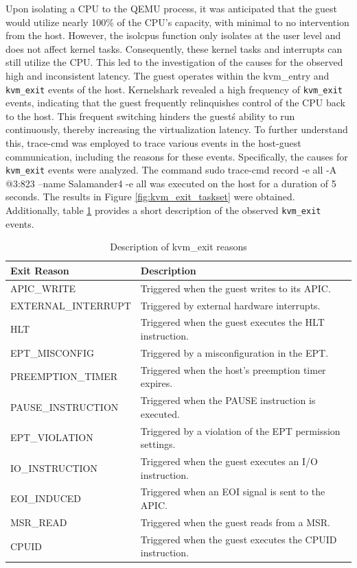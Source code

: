 \documentclass[MMR,Master,english]{twbook}
\begin{document}
\noindent Upon isolating a CPU to the QEMU process, it was anticipated that the guest would utilize nearly 100\% of the CPU's capacity, with minimal to no intervention from the host. However, the isolcpus function only isolates at the user level and does not affect kernel tasks. Consequently, these kernel tasks and interrupts can still utilize the CPU. This led to the investigation of the causes for the observed high and inconsistent latency. The guest operates within the kvm\_entry and \texttt{kvm\_exit} events of the host. Kernelshark revealed a high frequency of \texttt{kvm\_exit} events, indicating that the guest frequently relinquishes control of the CPU back to the host. This frequent switching hinders the guest\'s ability to run continuously, thereby increasing the virtualization latency. To further understand this, trace-cmd was employed to trace various events in the host-guest communication, including the reasons for these events. Specifically, the causes for \texttt{kvm\_exit} events were analyzed. The command sudo trace-cmd record -e all -A @3:823 --name Salamander4 -e all was executed on the host for a duration of 5 seconds. The results in Figure \ref{fig:kvm_exit_taskset} were obtained. Additionally, table \ref{tab:kvm_exit} provides a short description of the observed \texttt{kvm\_exit} events.


\begin{table}[H]
	\centering
	\begin{tabular}{|l|p{}|}
		\hline
		\textbf{Exit Reason} & \textbf{Description}                                     \\
		\hline
		APIC\_WRITE          & Triggered when the guest writes to its APIC.             \\ \hline
		EXTERNAL\_INTERRUPT  & Triggered by external hardware interrupts.               \\ \hline
		HLT                  & Triggered when the guest executes the HLT instruction.   \\ \hline
		EPT\_MISCONFIG       & Triggered by a misconfiguration in the EPT.              \\ \hline
		PREEMPTION\_TIMER    & Triggered when the host's preemption timer expires.      \\ \hline
		PAUSE\_INSTRUCTION   & Triggered when the PAUSE instruction is executed.        \\ \hline
		EPT\_VIOLATION       & Triggered by a violation of the EPT permission settings. \\ \hline
		IO\_INSTRUCTION      & Triggered when the guest executes an I/O instruction.    \\ \hline
		EOI\_INDUCED         & Triggered when an EOI signal is sent to the APIC.        \\ \hline
		MSR\_READ            & Triggered when the guest reads from a MSR.               \\ \hline
		CPUID                & Triggered when the guest executes the CPUID instruction. \\ \hline
	\end{tabular}
	\caption{Description of kvm\_exit reasons}
	\label{tab:kvm_exit}
\end{table}
\end{document}
